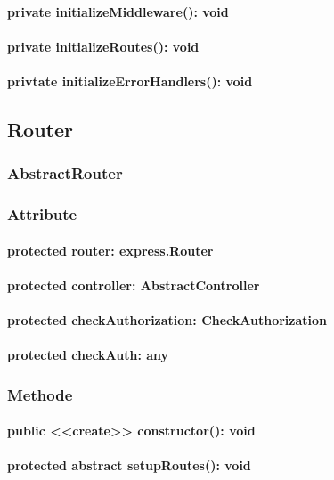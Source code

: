 \documentclass[parskip=full]{scrartcl}
\begin{document}
\paragraph{private initializeMiddleware(): void}
\paragraph{private initializeRoutes(): void}
\paragraph{privtate initializeErrorHandlers(): void}

\subsection{Router}
\subsubsection{AbstractRouter}
\subsubsection*{Attribute}
\paragraph{protected router: express.Router}
\paragraph{protected controller: AbstractController}
\paragraph{protected checkAuthorization: CheckAuthorization}
\paragraph{protected checkAuth: any}

\subsubsection*{Methode}
\paragraph{public <<create>> constructor(): void}
\paragraph{protected abstract setupRoutes(): void}
\end{document}
